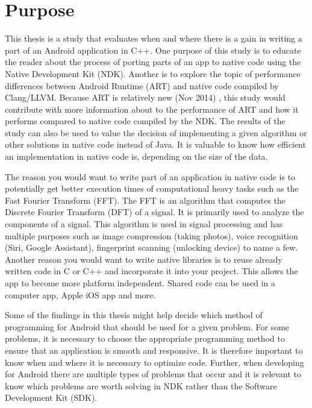\section{Purpose}
This thesis is a study that evaluates when and where there is a gain in writing a part of an Android application in C++. One purpose of this study is to educate the reader about the process of porting parts of an app to native code using the Native Development Kit (NDK). Another is to explore the topic of performance differences between Android Runtime (ART) and native code compiled by Clang/LLVM. Because ART is relatively new (Nov 2014) \cite{android:dalvik:release}, this study would contribute with more information about to the performance of ART and how it performs compared to native code compiled by the NDK. The results of the study can also be used to value the decision of implementing a given algorithm or other solutions in native code instead of Java. It is valuable to know how efficient an implementation in native code is, depending on the size of the data.


The reason you would want to write part of an application in native code is to potentially get better execution times of computational heavy tasks such as the Fast Fourier Transform (FFT). The FFT is an algorithm that computes the Discrete Fourier Transform (DFT) of a signal. It is primarily used to analyze the components of a signal. This algorithm is used in signal processing and has multiple purposes such as image compression (taking photos), voice recognition (Siri, Google Assistant), fingerprint scanning (unlocking device) to name a few. Another reason you would want to write native libraries is to reuse already written code in C or C++ and incorporate it into your project. This allows the app to become more platform independent. Shared code can be used in a computer app, Apple iOS app and more.

Some of the findings in this thesis might help decide which method of programming for Android that should be used for a given problem. For some problems, it is necessary to choose the appropriate programming method to ensure that an application is smooth and responsive. It is therefore important to know when and where it is necessary to optimize code. Further, when developing for Android there are multiple types of problems that occur and it is relevant to know which problems are worth solving in NDK rather than the Software Development Kit (SDK).

